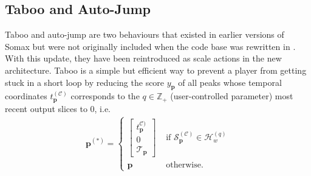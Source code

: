 \subsection{Taboo and Auto-Jump}
Taboo and auto-jump are two behaviours that existed in earlier versions of Somax but were not originally included when the code base was rewritten in \cite{borg_2019}. With this update, they have been reintroduced as scale actions in the new architecture. Taboo is a simple but efficient way to prevent a player from getting stuck in a short loop by reducing the score $y_{\bm p}$ of all peaks whose temporal coordinates $t_{\bm p}^{(\mathcal C)}$ corresponds to the $q \in \mathbb Z_+$ (user-controlled parameter) most recent output slices to 0, i.e.
	\begin{align}
		\bm p^{(\ast)} = \left\lbrace\begin{array}{cl}
				\begin{bmatrix} 
					t^{\mathcal C)}_{\bm p} \\ 0 \\ \mathcal T_{\bm p}
				\end{bmatrix} 
				& \text{ if } \mathcal S^{(\mathcal C)}_{\bm p} \in \mathcal H_w^{(q)}  \\ 
				\bm p & \text{ otherwise}.
			\end{array}\right.
	\end{align}
	
